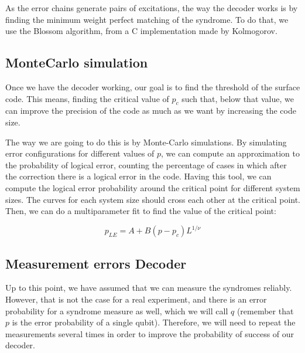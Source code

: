 \documentclass[a4paper,12pt]{article}
\begin{document}
As the error chains generate  pairs of excitations, the way the decoder works is by finding the minimum weight perfect matching of the syndrome. To do that, we use the Blossom algorithm, from a C implementation made by Kolmogorov.


\subsection{MonteCarlo simulation}

Once we have the decoder working, our goal is to find the threshold of the surface code. This means, finding the critical value of $p_c$ such that, below that value, we can improve the precision of the code as much as we want by increasing the code size.

The way we are going to do this is by Monte-Carlo simulations.  By simulating error configurations for different values of $p$, we can compute an approximation to the probability of logical error, counting the percentage of cases in which after the correction there is a logical error in the code. Having this tool, we can compute the logical error probability around the critical point for different system sizes. The curves for each system size should cross each other at the critical point. Then, we can do a multiparameter fit to find the value of the critical point:

\begin{equation}
p_{LE}=A+B(p-p_c)L^{1/\nu}
\end{equation}

\begin{figure}[ht!]
\begin{center}
\end{center}
\end{figure}


\subsection{Measurement errors Decoder}
Up to this point, we have assumed that we can measure the syndromes reliably. However, that is not the case for a real experiment, and there is an error probability for a syndrome measure as well, which we will call $q$ (remember that $p$ is the error probability of a single qubit). Therefore, we will need to repeat the measurements several times in order to improve the probability of success of our decoder.\\
\end{document}
